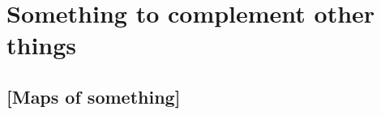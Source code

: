 \chapter[Appendix]{Something to complement other things}
\label{AppendixA}

\section{[Maps of something]}
